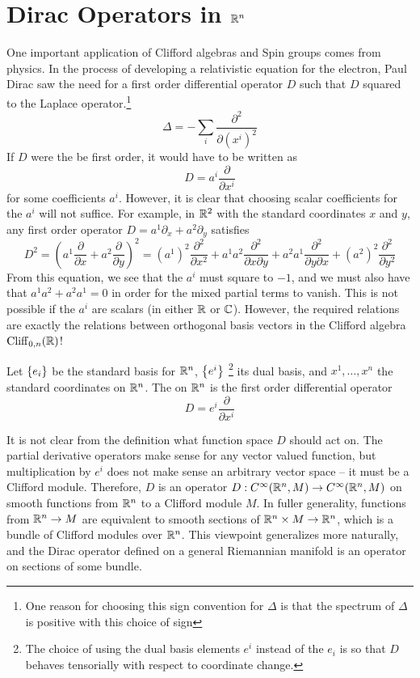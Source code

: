 %
\section{Dirac Operators in $\mathbb{R}^n$}
%
One important application of Clifford algebras and Spin groups comes from
physics. In the process of developing a relativistic equation for the electron,
Paul Dirac saw the need for a first order differential operator $D$ such
that $D$ squared to the Laplace operator.\footnote{One reason for choosing this sign
convention for $\Delta$ is that the spectrum of $\Delta$
is positive with this choice of sign}
\[
\Delta = -\sum_i \frac{\partial^2}{\partial(x^i)^2}
\]
If $D$ were the be first order, it would have to be written as
\[
D = a^i \frac{\partial}{\partial x^i}
\]
for some coefficients $a^i$. However, it is clear that choosing scalar coefficients
for the $a^i$ will not suffice. For example, in $\mathbb{R}^2$ with the standard coordinates
$x$ and $y$, any first order operator $D = a^1\partial_x + a^2\partial_y$ satisfies
\[
D^2 = \left(a^1\frac{\partial}{\partial x} + a^2\frac{\partial}{\partial y}\right)^2
= (a^1)^2\frac{\partial^2}{\partial x^2} + a^1a^2\frac{\partial^2}{\partial x \partial y}
+ a^2a^1 \frac{\partial^2}{\partial y \partial x} + (a^2)^2 \frac{\partial^2}{\partial y^2}
\]
From this equation, we see that the $a^i$ must square to $-1$, and we must also
have that $a^1a^2 + a^2a^1 = 0$ in order for the mixed partial terms to vanish.
This is not possible if the $a^i$ are scalars (in either $\mathbb{R}$ or $\mathbb{C}$).
However, the required relations are exactly the relations between orthogonal
basis vectors in the Clifford algebra $\operatorname{Cliff}_{0,n}(\mathbb{R})$!
%
\begin{defn}
Let $\left\lbrace e_i \right\rbrace$ be the standard basis for $\mathbb{R}^n$, $\left\lbrace e^i \right\rbrace$
\footnote{The choice of using the dual basis elements $e^i$ instead of the
$e_i$ is so that $D$ behaves tensorially with respect to coordinate change.}
its dual basis, and $x^1, \ldots ,x^n$ the standard coordinates on $\mathbb{R}^n$.
The  on $\mathbb{R}^n$ is the first order differential operator
\[
D = e^i\frac{\partial}{\partial x^i}
\]
\end{defn}
%
It is not clear from the definition what function space $D$ should act on.
The partial derivative operators make sense for any vector valued function, but
multiplication by $e^i$ does not make sense an arbitrary vector space -- it must
be a Clifford module. Therefore, $D$ is an operator
$D: C^\infty(\mathbb{R}^n, M) \to C^\infty(\mathbb{R}^n, M)$ on smooth functions from $\mathbb{R}^n$
to a Clifford module $M$. In fuller generality, functions from $\mathbb{R}^n \to M$
are equivalent to smooth sections of $\mathbb{R}^n \times M \to \mathbb{R}^n$, which is a bundle
of Clifford modules over $\mathbb{R}^n$. This viewpoint generalizes more naturally,
and the Dirac operator defined on a general Riemannian manifold is an operator
on sections of some bundle. \\

